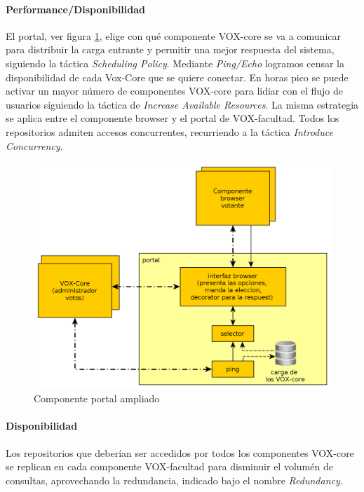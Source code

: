 \paragraph{Performance/Disponibilidad}
El portal,  ver figura \ref{fig:portal}, elige con qué componente VOX-core se va a comunicar para distribuir la carga entrante y permitir una mejor respuesta del sistema, siguiendo la táctica \textit{Scheduling Policy}. Mediante \textit{Ping/Echo} logramos censar la disponibilidad de cada Vox-Core que se quiere conectar. En horas pico se puede activar un mayor número de componentes VOX-core para lidiar con el flujo de usuarios siguiendo la táctica de \textit{Increase Available Resources}. La misma estrategia se aplica entre el componente browser y el portal de VOX-facultad.
Todos los repositorios admiten accesos concurrentes, recurriendo a la táctica \textit{Introduce Concurrency}.
\begin{figure}[H]
	\begin{center}
		\includegraphics[scale=0.22]{../diagramas/portal.png}
	\end{center}
	\caption{Componente portal ampliado}	
	\label{fig:portal}
\end{figure}

\paragraph{Disponibilidad}
Los repositorios que deberían ser accedidos por todos los componentes VOX-core se replican en cada componente VOX-facultad para disminuir el volumén de consultas, aprovechando la redundancia, indicado bajo el nombre \textit{Redundancy}.

